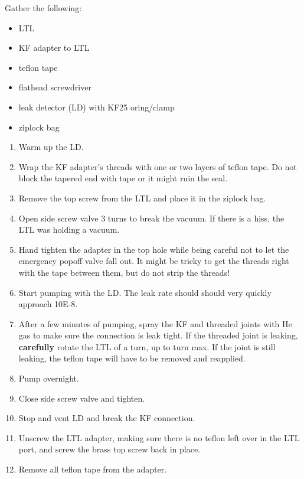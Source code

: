 \begin{minipage}{\linewidth}
Gather the following:

\begin{itemize}
 \item LTL
\item KF adapter to LTL
\item teflon tape
\item flathead screwdriver
\item leak detector (LD) with KF25 oring/clamp
\item ziplock bag
\end{itemize}
\end{minipage}


\begin{enumerate}
 \item Warm up the LD.
\item Wrap the KF adapter's threads with one or two layers of teflon tape.  Do not block the tapered end with tape or it might ruin the seal.
\item Remove the top screw from the LTL and place it in the ziplock bag.
\item Open side screw valve 3 turns to break the vacuum.  If there is a hiss, the LTL was holding a vacuum.
\item Hand tighten the adapter in the top hole while being careful not to let the emergency popoff valve fall out.  It might be tricky to get the threads right with the tape between them, but do not strip the threads!
\item Start pumping with the LD.  The leak rate should should very quickly approach 10E-8.
\item After a few minutes of pumping, spray the KF and threaded joints with He gas to make sure the connection is leak tight.  If the threaded joint is leaking, \textbf{carefully} rotate the LTL  of a turn, up to  turn max.  If the joint is still leaking, the teflon tape will have to be removed and reapplied.
\item Pump overnight.
\item Close side screw valve and tighten.
\item Stop and vent LD and break the KF connection.
\item Unscrew the LTL adapter, making sure there is no teflon left over in the LTL port, and screw the brass top screw back in place.
\item Remove all teflon tape from the adapter.
\end{enumerate}


